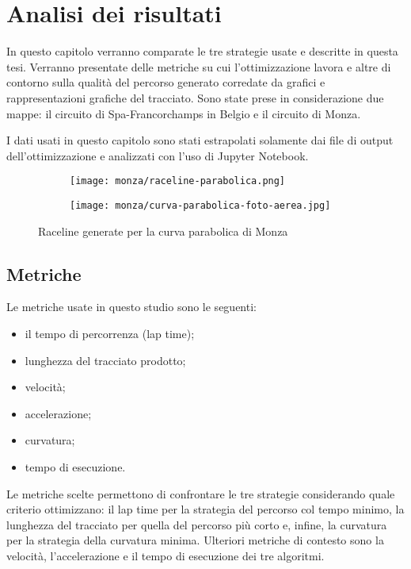 
\chapter{Analisi dei risultati}
In questo capitolo verranno comparate le tre strategie usate e descritte in questa tesi.
Verranno presentate delle metriche su cui l'ottimizzazione lavora e altre di contorno sulla
qualità del percorso generato corredate da grafici e rappresentazioni grafiche del tracciato.
Sono state prese in considerazione due mappe: il circuito di Spa-Francorchamps in Belgio e il circuito di
Monza.

I dati usati in questo capitolo sono stati estrapolati solamente dai file di output dell'ottimizzazione
e analizzati con l'uso di Jupyter Notebook.
\begin{figure}[H]
	\begin{center}
	\begin{subfigure}[l]{0.45\textwidth}
		\texttt{[image: monza/raceline-parabolica.png]}
	\end{subfigure}
	\begin{subfigure}[r]{0.5\textwidth}
		\texttt{[image: monza/curva-parabolica-foto-aerea.jpg]}
	\end{subfigure}
	\end{center}
	\caption{Raceline generate per la curva parabolica di Monza}
\end{figure}
\newpage
\section{Metriche}
Le metriche usate in questo studio sono le seguenti:
\begin{itemize}
	\item il tempo di percorrenza (lap time);
	\item lunghezza del tracciato prodotto;
	\item velocità; %
	\item accelerazione; %
	\item curvatura; %
	\item tempo di esecuzione.
\end{itemize}
Le metriche scelte permettono di confrontare le tre strategie considerando quale criterio 
ottimizzano: il lap time per la strategia del percorso col tempo minimo, la lunghezza del tracciato per
quella del percorso più corto e, infine, la curvatura per la strategia della curvatura minima.
Ulteriori metriche di contesto sono la velocità, l'accelerazione e il tempo di esecuzione dei tre
algoritmi.

